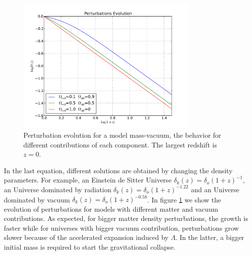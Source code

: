 \begin{figure}[htbp]
       \centering
               \includegraphics[width=0.8\textwidth]{Images/chapter2/masavacio.pdf}
       \caption{\small Perturbation evolution for a model mass-vacuum, the behavior
       for different contributions of each component. The largest redshift is $z=0$. }
       \label{masavacio}
 \end{figure}

In the last equation, different solutions are obtained by changing the density parameters. 
For example, an Einstein de Sitter Universe $\delta_k(z)=\delta_o(1+z)^{-1}$,  
an Universe dominated by radiation $\delta_k(z)=\delta_o(1+z)^{-1.22}$ and
an Universe dominated by vacuum $\delta_k(z)=\delta_o(1+z)^{-0.58}$. 
In figure \ref{masavacio} we show the evolution of perturbations for models with
different matter and vacuum contributions. As expected, for bigger matter density
perturbations, the growth is faster while for universes with bigger vacuum contribution, 
perturbations grow slower because of the accelerated expansion induced by $\Lambda$. 
In the latter, a bigger initial mass is required to start the gravitational collapse.

